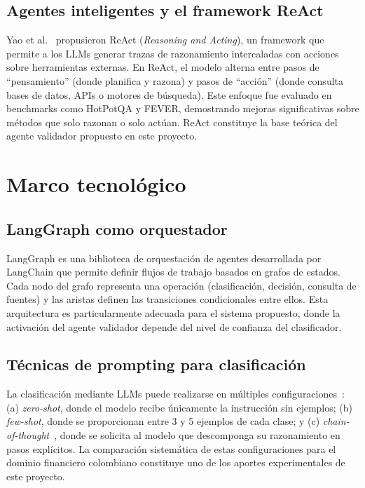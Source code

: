 \subsection{Agentes inteligentes y el framework ReAct}

Yao et al.~\cite{Yao2023} propusieron ReAct (\textit{Reasoning and Acting}), un framework que permite a los LLMs generar trazas de razonamiento intercaladas con acciones sobre herramientas externas. En ReAct, el modelo alterna entre pasos de ``pensamiento'' (donde planifica y razona) y pasos de ``acción'' (donde consulta bases de datos, APIs o motores de búsqueda). Este enfoque fue evaluado en benchmarks como HotPotQA y FEVER, demostrando mejoras significativas sobre métodos que solo razonan o solo actúan. ReAct constituye la base teórica del agente validador propuesto en este proyecto.

\section{Marco tecnológico}

\subsection{LangGraph como orquestador}

LangGraph es una biblioteca de orquestación de agentes desarrollada por LangChain que permite definir flujos de trabajo basados en grafos de estados. Cada nodo del grafo representa una operación (clasificación, decisión, consulta de fuentes) y las aristas definen las transiciones condicionales entre ellos. Esta arquitectura es particularmente adecuada para el sistema propuesto, donde la activación del agente validador depende del nivel de confianza del clasificador.

\subsection{Técnicas de prompting para clasificación}

La clasificación mediante LLMs puede realizarse en múltiples configuraciones~\cite{Brown2020}: (a) \textit{zero-shot}, donde el modelo recibe únicamente la instrucción sin ejemplos; (b) \textit{few-shot}, donde se proporcionan entre 3 y 5 ejemplos de cada clase; y (c) \textit{chain-of-thought}~\cite{Wei2022}, donde se solicita al modelo que descomponga su razonamiento en pasos explícitos. La comparación sistemática de estas configuraciones para el dominio financiero colombiano constituye uno de los aportes experimentales de este proyecto.

